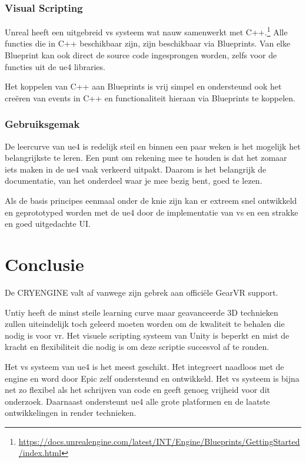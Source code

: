 \subsubsection{Visual Scripting}
Unreal heeft een uitgebreid \gls{vs} systeem wat nauw samenwerkt met C++.\footnote{\url{https://docs.unrealengine.com/latest/INT/Engine/Blueprints/GettingStarted/index.html}} Alle functies die in C++ beschikbaar zijn, zijn beschikbaar via Blueprints. Van elke Blueprint kan ook direct de source code ingesprongen worden, zelfs voor de functies uit de \gls{ue4} libraries.

Het koppelen van C++ aan Blueprints is vrij simpel en ondersteund ook het creëren van events in C++ en functionaliteit hieraan via Blueprints te koppelen.

\subsubsection{Gebruiksgemak}
De leercurve van \gls{ue4} is redelijk steil en binnen een paar weken is het mogelijk het belangrijkste te leren. Een punt om rekening mee te houden is dat het zomaar iets maken in de \gls{ue4} vaak verkeerd uitpakt. Daarom is het belangrijk de documentatie, van het onderdeel waar je mee bezig bent, goed te lezen.

Als de basis principes eenmaal onder de knie zijn kan er extreem snel ontwikkeld en geprototyped worden met de \gls{ue4} door de implementatie van \gls{vs} en een strakke en goed uitgedachte UI.

\section{Conclusie}
De CRYENGINE valt af vanwege zijn gebrek aan officiële GearVR support. 

Untiy heeft de minst steile learning curve maar geavanceerde 3D technieken zullen uiteindelijk toch geleerd moeten worden om de kwaliteit te behalen die nodig is voor \gls{vr}. Het visuele scripting systeem van Unity is beperkt en mist de kracht en flexibiliteit die nodig is om deze scriptie succesvol af te ronden.

Het \gls{vs} systeem van \gls{ue4} is het meest geschikt. Het integreert naadloos met de engine en word door Epic zelf ondersteund en ontwikkeld. Het \gls{vs} systeem is bijna net zo flexibel als het schrijven van code en geeft genoeg vrijheid voor dit onderzoek. Daarnaast ondersteunt \gls{ue4} alle grote platformen en de laatste ontwikkelingen in render technieken.
